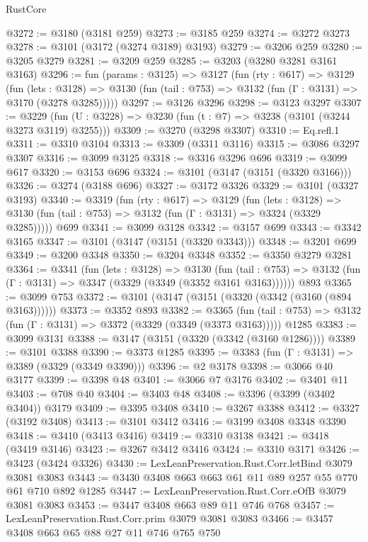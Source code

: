 \begin{lexlean}{RustCore}
\begin{coremodule}
@3272 := @3180 (@3181 @259)
@3273 := @3185 @259
@3274 := @3272 @3273
@3278 := @3101 (@3172 (@3274 @3189) @3193)
@3279 := @3206 @259
@3280 := @3205 @3279
@3281 := @3209 @259
@3285 := @3203 (@3280 @3281 @3161 @3163)
@3296 := fun (params : @3125) =>
  @3127
    (fun (rty : @617) =>
    @3129
      (fun (lets : @3128) =>
      @3130 (fun (tail : @753) => @3132 (fun (Γ : @3131) => @3170 (@3278 @3285)))))
@3297 := @3126 @3296
@3298 := @3123 @3297
@3307 := @3229 (fun (U : @3228) => @3230 (fun (t : @7) => @3238 (@3101 (@3244 @3273 @3119) @3255)))
@3309 := @3270 (@3298 @3307)
@3310 := Eq.refl.{1}
@3311 := @3310 @3104
@3313 := @3309 (@3311 @3116)
@3315 := @3086 @3297 @3307
@3316 := @3099 @3125
@3318 := @3316 @3296 @696
@3319 := @3099 @617
@3320 := @3153 @696
@3324 := @3101 (@3147 (@3151 (@3320 @3166)))
@3326 := @3274 (@3188 @696)
@3327 := @3172 @3326
@3329 := @3101 (@3327 @3193)
@3340 := @3319
    (fun (rty : @617) =>
    @3129
      (fun (lets : @3128) =>
      @3130 (fun (tail : @753) => @3132 (fun (Γ : @3131) => @3324 (@3329 @3285)))))
    @699
@3341 := @3099 @3128
@3342 := @3157 @699
@3343 := @3342 @3165
@3347 := @3101 (@3147 (@3151 (@3320 @3343)))
@3348 := @3201 @699
@3349 := @3200 @3348
@3350 := @3204 @3348
@3352 := @3350 @3279 @3281
@3364 := @3341
    (fun (lets : @3128) =>
    @3130
      (fun (tail : @753) => @3132 (fun (Γ : @3131) => @3347 (@3329 (@3349 (@3352 @3161 @3163))))))
    @893
@3365 := @3099 @753
@3372 := @3101 (@3147 (@3151 (@3320 (@3342 (@3160 (@894 @3163))))))
@3373 := @3352 @893
@3382 := @3365
    (fun (tail : @753) => @3132 (fun (Γ : @3131) => @3372 (@3329 (@3349 (@3373 @3163)))))
    @1285
@3383 := @3099 @3131
@3388 := @3147 (@3151 (@3320 (@3342 (@3160 @1286))))
@3389 := @3101 @3388
@3390 := @3373 @1285
@3395 := @3383 (fun (Γ : @3131) => @3389 (@3329 (@3349 @3390)))
@3396 := @2 @3178
@3398 := @3066 @40 @3177
@3399 := @3398 @48
@3401 := @3066 @7 @3176
@3402 := @3401 @11
@3403 := @708 @40
@3404 := @3403 @48
@3408 := @3396 (@3399 (@3402 @3404)) @3179
@3409 := @3395 @3408
@3410 := @3267 @3388
@3412 := @3327 (@3192 @3408)
@3413 := @3101 @3412
@3416 := @3199 @3408 @3348 @3390
@3418 := @3410 (@3413 @3416)
@3419 := @3310 @3138
@3421 := @3418 (@3419 @3146)
@3423 := @3267 @3412 @3416
@3424 := @3310 @3171
@3426 := @3423 (@3424 @3326)
@3430 := LexLeanPreservation.Rust.Corr.letBind @3079 @3081 @3083
@3443 := @3430 @3408 @663 @663 @61 @11 @89 @257 @55 @770 @61 @710 @892 @1285
@3447 := LexLeanPreservation.Rust.Corr.eOfB @3079 @3081 @3083
@3453 := @3447 @3408 @663 @89 @11 @746 @768
@3457 := LexLeanPreservation.Rust.Corr.prim @3079 @3081 @3083
@3466 := @3457 @3408 @663 @65 @88 @27 @11 @746 @765 @750

\end{coremodule}
\end{lexlean}
